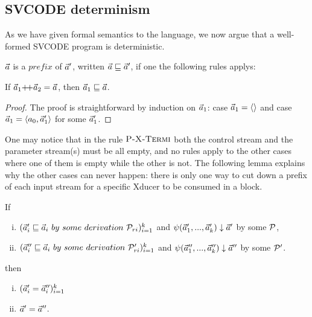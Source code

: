 %
%



\subsection{SVCODE determinism}

As we have given formal semantics to the language, we now argue that a well-formed SVCODE program is deterministic.

 
\begin{defi}
	$\vec a$ is a $prefix$ of $\vec a'$, written $\vec a \sqsubseteq \vec a'$, if one the following rules applys: \\
	
	\emph{}
	
\end{defi}

\begin{lem}\label{lem-app2pre}
	If $\a_1 {\++} \a_2 = \a$, then $\vec a_1 \sqsubseteq \vec a$.
\end{lem}
\begin{proof}
	The proof is straightforward by induction on $\vec a_1$: case $\vec a_1 = \langle \rangle$ and case $ \a_1 = \< a_0, \a_1' \'>$ for some $\vec a_1'$.
\end{proof}

One may notice that in the rule $\textsc{P-X-Termi}$ both the control stream and the parameter stream(s) must be all empty, and no rules apply to the other cases where one of them is empty while the other is not. The following lemma explains why the other cases can never happen: 
there is only one way to cut down a prefix of each input stream for
a specific Xducer to be consumed in a block.


\begin{lem} \label{lem-block-unique}
	If
	\begin{enumerate}[(i)]
		\item $(\a_i' \prefix  \a_i \ by \ some \ derivation \ \MP_{ri})^k_{i=1}$ and ${\psi}(\vec a_1',...,\vec a_k') \downarrow \vec a'$ by some $\mathcal{P}$, 
		\item $(\a_i'' \prefix \a_i \ by \ some \ derivation \ \MP'_{ri})^k_{i=1}$ and
		${\psi}(\vec a_1'',...,\vec a_k'') \downarrow \vec a''$ by some $\mathcal{P}'$.
	\end{enumerate} 
	then \begin{enumerate}[(i)]
		\item $(\vec a_i' = \vec a_i'')^k_{i=1}$ 
		\item $\vec a' = \vec a''$.
	\end{enumerate}
\end{lem}

